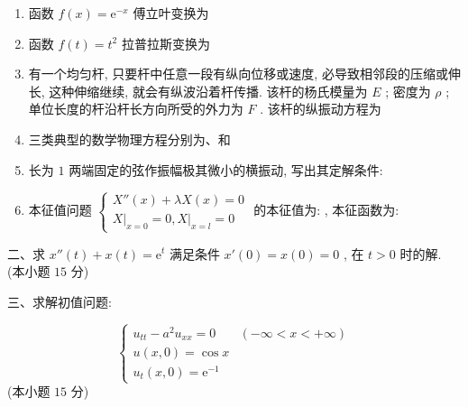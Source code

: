 \documentclass{article}
\theoremstyle{nonumberplain}
\newcommand{\ee}{\mathrm{e}}
\begin{document}
    \begin{enumerate}
    	\item 函数 $f(x)=\ee^{-x}$ 傅立叶变换为\underline{\hspace{8pc}}
    	
    	\item 函数 $f(t)=t^2$ 拉普拉斯变换为\underline{\hspace{8pc}}
    	
    	\item 有一个均匀杆, 只要杆中任意一段有纵向位移或速度, 必导致相邻段的压缩或伸长, 这种伸缩继续, 就会有纵波沿着杆传播. 该杆的杨氏模量为 $E$ ; 密度为 $\rho$ ; 单位长度的杆沿杆长方向所受的外力为 $F$ . 该杆的纵振动方程为\underline{\hspace{8pc}}
    	
    	\item 三类典型的数学物理方程分别为\underline{\hspace{8pc}}、\underline{\hspace{8pc}}和\underline{\hspace{8pc}}
    	
    	\item 长为 $1$ 两端固定的弦作振幅极其微小的横振动, 写出其定解条件: \underline{\hspace{8pc}}
    	
    	\item 本征值问题 $\begin{cases}
    	X''(x)+\lambda X(x)=0\\
    	\left. X \right|_{x=0}=0,\left. X \right|_{x=l}=0
    	\end{cases}$ 的本征值为: \underline{\hspace{6pc}}, 本征函数为: \underline{\hspace{6pc}}
    \end{enumerate}
    
    \begin{flushleft}
    	二、求 $x''(t)+x(t)=\ee^t$ 满足条件 $x'(0)=x(0)=0$ , 在 $t>0$ 时的解. (本小题 $15$ 分)
    \end{flushleft}
    
    \begin{flushleft}
    	三、求解初值问题:
    \end{flushleft}
    \begin{equation*}
    \begin{cases}
    u_{tt}-a^2u_{xx}=0 & (-\infty<x<+\infty)\\
    u(x,0)=\cos x\\
    u_{t}(x,0)=\ee^{-1}
    \end{cases}
    \end{equation*}
    (本小题 $15$ 分)
    
\end{document}
